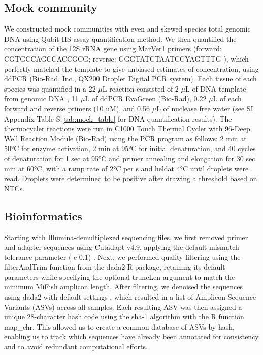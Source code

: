 \documentclass{article}
\begin{document}
\subsection*{Mock community}

We constructed mock communities with even and skewed species total genomic DNA using Qubit HS assay quantification method. We then quantified the concentration of the 12S rRNA gene using MarVer1 primers (forward: CGTGCCAGCCACCGCG; reverse: GGGTATCTAATCCYAGTTTG \cite{valsecchi2020}), which perfectly matched the template to give unbiased estimates of concentration, using ddPCR (Bio-Rad, Inc., QX200 Droplet Digital PCR system). Each tissue of each species was quantified in a 22 $\mu$L reaction consisted of 2 $\mu$L of DNA template from genomic DNA , 11 $\mu$L of ddPCR EvaGreen (Bio-Rad), 0.22 $\mu$L of each forward and reverse primers (10 uM), and 0.56 $\mu$L of nuclease free water (see SI Appendix Table S.\ref{tab:mock_table} for DNA quantification results). The thermocycler reactions were run in C1000 Touch Thermal Cycler with 96-Deep Well Reaction Module (Bio-Rad) using the PCR program as follows: 2 min at 50°C for enzyme activation, 2 min at 95°C for initial denaturation, and 40 cycles of denaturation for 1 sec at 95°C and primer annealing and elongation for 30 sec min at 60°C, with a ramp rate of 2°C per s and heldat 4°C until droplets were read. Droplets were determined to be positive after drawing a threshold based on NTCs. 

\subsection*{Bioinformatics}
Starting with Illumina-demultiplexed sequencing files, we first removed primer and adapter sequences using Cutadapt v4.9, applying the default mismatch tolerance parameter (-e 0.1) \cite{martin2011}. Next, we performed quality filtering using the filterAndTrim function from the dada2 R package, retaining its default parameters while specifying the optional truncLen argument to match the minimum MiFish amplicon length. After filtering, we denoised the sequences using dada2 with default settings \cite{callahan2016}, which resulted in a list of Amplicon Sequence Variants (ASVs) across all samples. Each resulting ASV was then assigned a unique 28-character hash code using the sha-1 algorithm with the R function map\_chr. This allowed us to create a common database of ASVs by hash, enabling us to track which sequences have already been annotated for consistency and to avoid redundant computational efforts.
\end{document}
